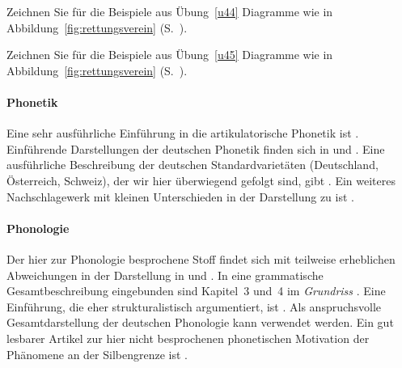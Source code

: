 \Uebung[\tristar] \label{u49} Zeichnen Sie für die Beispiele aus Übung~\ref{u44} Diagramme wie in Abbildung~\ref{fig:rettungsverein} (S.~\pageref{fig:rettungsverein}).

\Uebung[\tristar] \label{u50} Zeichnen Sie für die Beispiele aus Übung~\ref{u45} Diagramme wie in Abbildung~\ref{fig:rettungsverein} (S.~\pageref{fig:rettungsverein}).


\WeitereLiteratur

\paragraph*{Phonetik}

Eine sehr ausführliche Einführung in die artikulatorische Phonetik ist \citet{Laver94}.
Einführende Darstellungen der deutschen Phonetik finden sich \zB in \citet{RRKWS09} und \citet{Wiese10}.
Eine ausführliche Beschreibung der deutschen Standardvarietäten (Deutschland, Österreich, Schweiz), der wir hier überwiegend gefolgt sind, gibt \citet{Krech-ea2009}.
Ein weiteres Nachschlagewerk mit kleinen Unterschieden in der Darstellung zu \citealp{Krech-ea2009} ist \citet{Mangold06}.

\paragraph*{Phonologie}

\label{abs:pholliteratur}

Der hier zur Phonologie besprochene Stoff findet sich mit teilweise erheblichen Abweichungen in der Darstellung \zB in \citet{Hall00} und \citet{Wiese10}.
In eine grammatische Gesamtbeschreibung eingebunden sind Kapitel~3 und~4 im \textit{Grundriss} \citep{Eisenberg1}.
Eine Einführung, die eher strukturalistisch argumentiert, ist \citet{Ternes2012}.
Als anspruchsvolle Gesamtdarstellung der deutschen Phonologie kann \citet{Wiese00} verwendet werden.
Ein gut lesbarer Artikel zur hier nicht besprochenen phonetischen Motivation der Phänomene an der Silbengrenze ist \citet{Maas2002}. 
